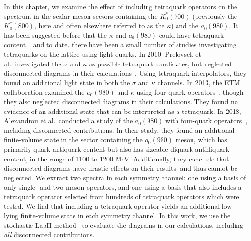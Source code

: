 In this chapter, we examine the effect of including tetraquark operators on the spectrum in the scalar meson sectors containing the $K_0^*(700)$ (previously the $K_0^*(800)$, here and often elsewhere referred to as the $\kappa$) and the $a_0(980)$. It has been suggested before that the $\kappa$ and $a_0(980)$ could have tetraquark content~\cite{Jaffe:2004ph, Amsler:2004ps, Close:2002zu, Maiani:2004uc}, and to date, there have been a small number of studies investigating tetraquarks on the lattice using light quarks. In 2010, Prelovsek et al.\ investigated the $\sigma$ and $\kappa$ as possible tetraquark candidates, but neglected disconnected diagrams in their calculations~\cite{Prelovsek:2010kg}. Using tetraquark interpolators, they found an additional light state in both the $\sigma$ and $\kappa$ channels. In 2013, the ETM collaboration examined the $a_0(980)$ and $\kappa$ using four-quark operators~\cite{Alexandrou:2012rm}, though they also neglected disconnected diagrams in their calculations. They found no evidence of an additional state that can be interpreted as a tetraquark. In 2018, Alexandrou et al.\ conducted a study of the $a_0(980)$ with four-quark operators~\cite{Alexandrou:2017itd}, including disconnected contributions. In their study, they found an additional finite-volume state in the sector containing the $a_0(980)$ meson, which has primarily quark-antiquark content but also has sizeable diquark-antidiquark content, in the range of 1100 to 1200 MeV. Additionally, they conclude that disconnected diagrams have drastic effects on their results, and thus cannot be neglected. We extract two spectra in each symmetry channel: one using a basis of only single- and two-meson operators, and one using a basis that also includes a tetraquark operator selected from hundreds of tetraquark operators which were tested. We find that including a tetraquark operator yields an additional low-lying finite-volume state in each symmetry channel. In this work, we use the stochastic LapH method~\cite{Morningstar:2011ka} to evaluate the diagrams in our calculations, including \textit{all} disconnected contributions.
